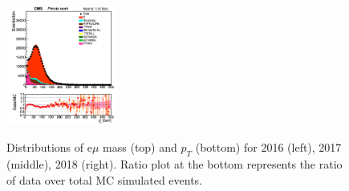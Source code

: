 \documentclass{cernatlasnote}
\begin{document}
\begin{figure}[htp]
 \includegraphics[width=0.32\textwidth]{images/emu_channel/2018/18_Range_0pt7_1pt3/Dilepton_pt_filter_M20_MET40_Linear.png}\\
 \caption{Distributions of e$\mu$ mass (top) and $p_{T}$ (bottom) for 2016 (left), 2017 (middle), 2018 (right). Ratio plot at the bottom represents the ratio of data over total MC simulated events.}
 \label{fig:mu_dist}
  \end{figure}
\end{document}
